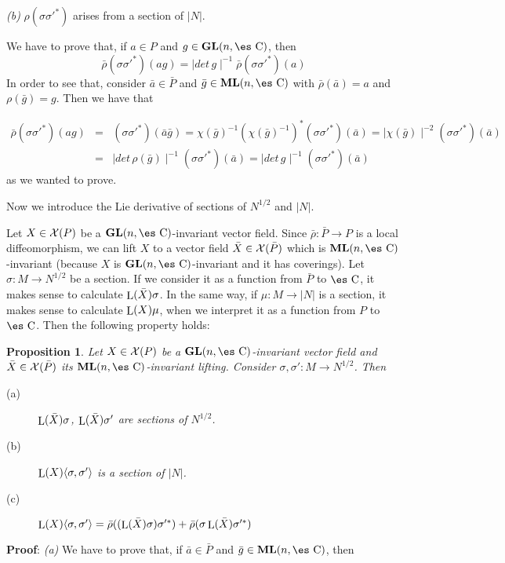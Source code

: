 \documentclass[12pt]{article}
\newtheorem{prop}{Proposition}
\def\beann{\begin{eqnarray*}}
\def\eeann{\end{eqnarray*}}
\def\qed{\ifvmode\removelastskip\fi
{\unskip\nobreak\hfil\penalty50\hbox{}\nobreak\hfil
\hbox{\vrule height1.2ex width1.2ex}\parfillskip=0pt
\finalhyphendemerits=0 \par\smallskip}}
\def\GL{{\bf GL}(n,\Complex )}
\def\ML{{\bf ML}(n,\Complex )}
\def\Complex{\mbox{\es C}}
\def\Lie{\mathop{\rm L}\nolimits}
\begin{document}
\quad \quad
{\it (b)} \quad
$\rho (\sigma \sigma '^*)$ arises from a section of $| N |$.

We have to prove that, if $a \in P$ and $g \in \GL$, then
$$
\bar \rho (\sigma \sigma '^*)(ag) =
\mid det\, g \mid^{-1} \bar \rho (\sigma \sigma '^*)(a)
$$
In order to see that, consider $\bar a \in \bar P$ and $\bar g \in \ML$
with $\bar \rho (\bar a) = a$ and $\rho (\bar g) = g$. Then we have that

\beann
\bar \rho (\sigma \sigma '^*)(ag)
& = &
(\sigma \sigma '^*)(\bar a \bar g) =
\chi (\bar g)^{-1} (\chi (\bar g)^{-1})^*
(\sigma \sigma '^*)(\bar a) =
\mid \chi (\bar g) \mid ^{-2} (\sigma \sigma '^*)(\bar a)
\\
& = &
\mid det\, \rho (\bar g) \mid ^{-1} (\sigma \sigma '^*)(\bar a) =
\mid det\, g \mid ^{-1} (\sigma \sigma '^*)(\bar a)
\eeann
as we wanted to prove.
\qed

Now we introduce the Lie derivative of sections of $N^{1/2}$ and $| N
|$.

Let $X \in {\cal X}(P)$ be a $\GL$-invariant vector field. Since
$\bar \rho : \bar P \to P$ is a local diffeomorphism, we can lift
$X$ to a vector field $\bar X \in {\cal X}(\bar P)$ which is
$\ML$-invariant (because $X$ is $\GL$-invariant and it has
coverings). Let $\sigma : M \to N^{1/2}$ be a section. If we
consider it as a function from $\bar P$ to $\Complex$, it makes
sense to calculate $\Lie(\bar X) \sigma$. In the same way, if $\mu
: M \to | N |$ is a section, it makes sense to calculate $\Lie(X)
\mu$, when we interpret it as a function from $P$ to $\Complex$.
Then the following property holds:

\begin{prop}
Let $X \in {\cal X}(P)$ be a $\GL$-invariant vector field
and $\bar X \in {\cal X}(\bar P)$ its $\ML$-invariant lifting.
Consider $\sigma , \sigma ' : M \to N^{1/2}$. Then
\begin{description}
\item[{\rm (a)}]
$\Lie(\bar X) \sigma$, $\Lie(\bar X) \sigma '$
are sections of $N^{1/2}$.
\item[{\rm (b)}]
$\Lie(X) \langle \sigma ,\sigma ' \rangle$
is a section of $| N |$.
\item[{\rm (c)}]
$\Lie(X) \langle \sigma ,\sigma ' \rangle =
\bar \rho ((\Lie(\bar X)  \sigma )\sigma '^*) +
\bar \rho (\sigma \Lie(\bar X) \sigma '^*)$
\end{description}
\label{propi2}
\end{prop}
{\bf Proof}: 
{\it (a)} \quad
We have to prove that, if $\bar a \in \bar P$ and $\bar g \in \ML$, then
\end{document}
